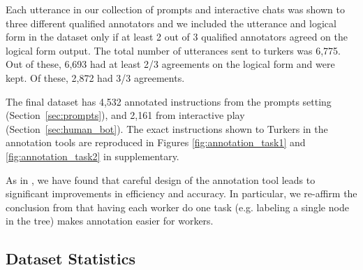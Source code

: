 Each utterance in our collection of prompts and interactive  chats was shown to three different qualified annotators and we included the utterance and logical form in the dataset only if at least 2 out of 3 qualified annotators agreed on the logical form output.   The total number of utterances sent to turkers was 6,775.  Out of these, 6,693 had at least 2/3 agreements on the logical form and were kept.  Of these, 2,872 had 3/3 agreements. 


The final dataset has  4,532 annotated instructions from the prompts setting (Section~\ref{sec:prompts}), and 2,161 from interactive play (Section~\ref{sec:human_bot}). The exact instructions shown to Turkers in the annotation tools are reproduced in Figures \ref{fig:annotation_task1} and \ref{fig:annotation_task2} in supplementary.
 
As in \citep{yih2016value}, we have found that careful design of the annotation tool leads to significant improvements in efficiency and accuracy.  In particular, we re-affirm the conclusion from \cite{yih2016value} that having each worker do one task (e.g. labeling a single node in the tree) makes annotation easier for workers. %

\subsection{Dataset Statistics}
\label{sec:dataset_statistics}


